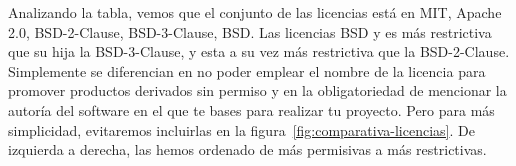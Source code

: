 Analizando la tabla, vemos que el conjunto de las licencias está en MIT, Apache 2.0, BSD-2-Clause, BSD-3-Clause, BSD. Las licencias BSD y es más restrictiva que su hija la BSD-3-Clause, y esta a su vez más restrictiva que la BSD-2-Clause. Simplemente se diferencian en no poder emplear el nombre de la licencia para promover productos derivados sin permiso y en la obligatoriedad de mencionar la autoría del software en el que te bases para realizar tu proyecto. Pero para más simplicidad, evitaremos incluirlas en la figura~\ref{fig:comparativa-licencias}. De izquierda a derecha, las hemos ordenado de más permisivas a más restrictivas.

